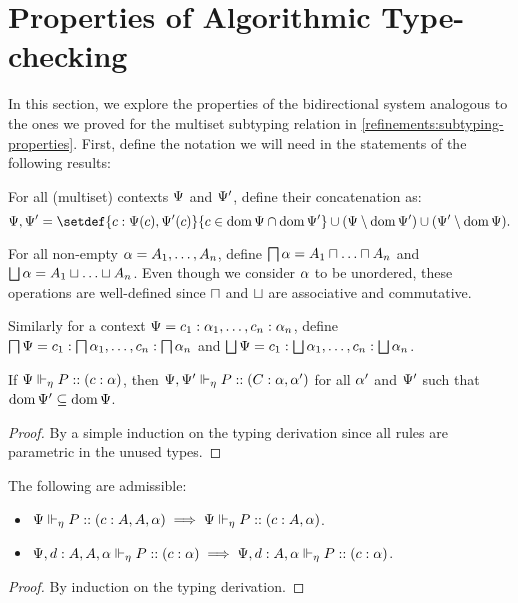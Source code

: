 
\section{Properties of Algorithmic Type-checking}

In this section, we explore the properties of the bidirectional system analogous to the ones we proved for the multiset subtyping relation in \cref{refinements:subtyping-properties}. First, define the notation we will need in the statements of the following results:

\begin{definition}
  For all (multiset) contexts $\Psi$ and $\Psi'$, define their concatenation as:
  $$
  \ctx, \ctx' = \setdef{c : \lookup \ctx c, \lookup {\ctx'} c}{c \in \dom\ctx \cap \dom{\ctx'}} \cup \parens{\ctx \setminus \dom{\ctx'}} \cup \parens{\ctx' \setminus \dom{\ctx}}.
  $$
\end{definition}

\begin{definition}
  For all non-empty $\alpha = A_1, \ldots, A_n$, define $\bigsqcap{\alpha} = A_1 \mathbin{\sqcap} \ldots \mathbin{\sqcap} A_n$ and $\bigsqcup{\alpha} = A_1 \mathbin{\sqcup} \ldots \mathbin{\sqcup} A_n$. Even though we consider $\alpha$ to be unordered, these operations are well-defined since $\mathbin{\sqcap}$ and $\mathbin{\sqcup}$ are associative and commutative.

  Similarly for a context $\Psi = c_1 : \alpha_1, \ldots, c_n : \alpha_n$, define $\bigsqcap{\Psi} = c_1 : \bigsqcap{\alpha_1}, \ldots, c_n : \bigsqcap{\alpha_n}$ and $\bigsqcup{\Psi} = c_1 : \bigsqcup{\alpha_1}, \ldots, c_n : \bigsqcup{\alpha_n}$.
\end{definition}


\begin{lemma}[Weakening]
  If ${\Psi} \Vdash_{\eta} P :: (c : \alpha)$, then ${\Psi, \Psi'} \Vdash_{\eta} P :: (C : \alpha, \alpha')$ for all $\alpha'$ and $\Psi'$ such that $\operatorname{dom}{\Psi'} \subseteq \operatorname{dom}\Psi$.
\end{lemma}
\begin{proof}
  By a simple induction on the typing derivation since all rules are parametric in the unused types.
\end{proof}

\begin{lemma}[Contraction]
  The following are admissible:
  \begin{itemize}
    \item ${\Psi} \Vdash_{\eta} P :: (c : A, A, \alpha) \implies {\Psi} \Vdash_{\eta} P :: (c : A, \alpha)$.
    \item ${\Psi, d : A, A, \alpha} \Vdash_{\eta} P :: (c : \alpha) \implies {\Psi, d : A, \alpha} \Vdash_{\eta} P :: (c : \alpha)$.
  \end{itemize}
\end{lemma}
\begin{proof}
  By induction on the typing derivation.
\end{proof}

